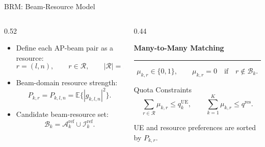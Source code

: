 \documentclass[aspectratio=169, 10pt]{beamer}
\newcommand{\slideheading}[1]{%
    \par\vspace{0.08cm}%
    \settowidth{\dimen0}{\bfseries\large #1}%
    {\bfseries\large #1}%
    \par\vspace{0.015cm}%
    {\color{black}\rule{\dimen0}{0.7pt}}%
    \par\vspace{0.16cm}%
}
\begin{document}
\begin{frame}{BRM: Beam-Resource Model}
    \begin{columns}[T,onlytextwidth]
        \begin{column}{0.52\textwidth}
            \begin{itemize}
                \setlength{\itemsep}{0.8em}
                \item Define each AP-beam pair as a resource:
                      \[
                          r=(l,n), \qquad r\in\mathcal{R}, \qquad |\mathcal{R}|=LN.
                      \]
                \item Beam-domain resource strength:
                      \[
                          P_{k,r}
                          =
                          P_{k,l,n}
                          =
                          \mathbb{E}\{|g_{k,l,n}|^2\}.
                      \]
                \item Candidate beam-resource set:
                      \[
                          \mathcal{B}_k
                          =
                          \mathcal{A}_k^{\mathrm{ref}}
                          \cup
                          \mathcal{I}_k^{\mathrm{ref}}.
                      \]
            \end{itemize}
        \end{column}
        \begin{column}{0.44\textwidth}
            \slideheading{Many-to-Many Matching}
            \[
                \mu_{k,r}\in\{0,1\},
                \qquad
                \mu_{k,r}=0
                \quad
                \text{if}
                \quad
                r\notin\mathcal{B}_k.
            \]
            \begin{block}{Quota Constraints}
                \[
                    \sum_{r\in\mathcal{R}}\mu_{k,r}\le q_k^{\mathrm{UE}},
                    \qquad
                    \sum_{k=1}^{K}\mu_{k,r}\le q^{\mathrm{res}}.
                \]
            \end{block}
            \vspace{-0.05cm}
            UE and resource preferences are sorted by \(P_{k,r}\).
        \end{column}
    \end{columns}
\end{frame}
\end{document}
